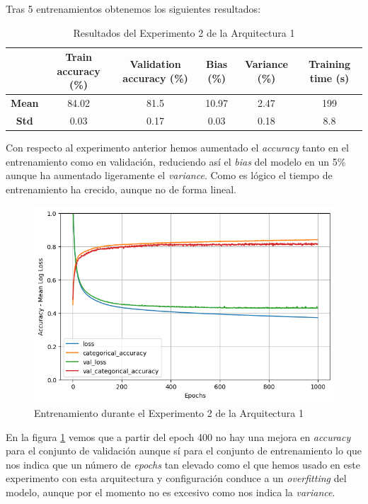 \documentclass{article}
\begin{document}
			Tras 5 entrenamientos obtenemos los siguientes resultados:
			\begin{table}[!h]
				\begin{center}
					\begin{tabular}{ c | c | c | c | c | c |}
						\ & \textbf{Train accuracy (\%)} & \textbf{Validation accuracy (\%)} & \textbf{Bias (\%)} & \textbf{Variance (\%)} & \textbf{Training time (s)} \\ \hline
						\textbf{Mean} & 84.02 & 81.5 & 10.97 & 2.47 & 199\\ \hline
						\textbf{Std} & 0.03 & 0.17 & 0.03 & 0.18 & 8.8 \\ \hline
					\end{tabular}
					\caption{Resultados del Experimento 2 de la Arquitectura 1}
					\label{tab:res-d-a1-e2}
				\end{center}
			\end{table}
			Con respecto al experimento anterior hemos aumentado el \textit{accuracy} tanto en el entrenamiento como en validaci\'on, reduciendo as\'i el \textit{bias} del modelo en un 5\% aunque ha aumentado ligeramente el \textit{variance}. Como es l\'ogico el tiempo de entrenamiento ha crecido, aunque no de forma lineal.\\
			\begin{figure}[!h]
				\begin{center}
					\includegraphics[scale=0.5]{d-tr-a1-e2.png}		
					\caption{Entrenamiento durante el Experimento 2 de la Arquitectura 1}	
					\label{d-tr-a1-e2}
				\end{center}
			\end{figure}
			En la figura \ref{d-tr-a1-e2} vemos que a partir del epoch 400 no hay una mejora en \textit{accuracy} para el conjunto de validaci\'on aunque s\'i para el conjunto de entrenamiento lo que nos indica que un n\'umero de \textit{epochs} tan elevado como el que hemos usado en este experimento con esta arquitectura y configuraci\'on conduce a un \textit{overfitting} del modelo, aunque por el momento no es excesivo como nos indica la \textit{variance}.
			
\end{document}
